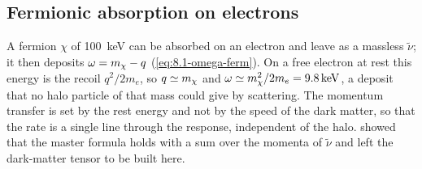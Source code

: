 \subsection{Fermionic absorption on electrons}\label{sec:10.9-fermionic}

A fermion $\chi$ of \SI{100}{keV} can be absorbed on an electron and leave as a massless $\tilde\nu$; it then deposits $\omega = m_{\chi} - q$ (\cref{eq:8.1-omega-ferm}). On a free electron at rest this energy is the recoil $q^2/2m_e$, so $q \simeq m_{\chi}$ and $\omega \simeq m_{\chi}^2/2m_e = \SI{9.8}{keV}$, a deposit that no halo particle of that mass could give by scattering. The momentum transfer is set by the rest energy and not by the speed of the dark matter, so that the rate is a single line through the response, independent of the halo.  showed that the master formula holds with a sum over the momenta of $\tilde\nu$ and left the dark-matter tensor to be built here.

